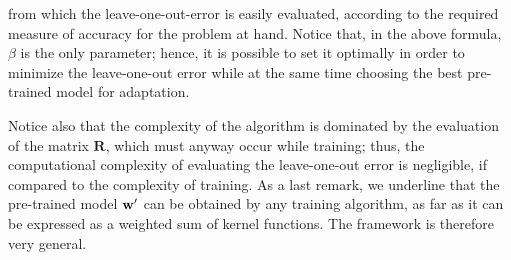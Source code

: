 \noindent from which the leave-one-out-error is easily evaluated, according
to the required measure of accuracy for the problem at hand. Notice that,
in the above formula, $\beta$ is the only parameter; hence,
it is possible to set it optimally in order to minimize the leave-one-out error
while at the same time choosing the best pre-trained model for adaptation.

Notice also that the complexity of the algorithm is dominated by the evaluation
of the matrix $\boldsymbol{R}$, which must anyway occur while training; thus,
the computational complexity of evaluating the leave-one-out error is negligible, if
compared to the complexity of training. As a last remark,
we underline that the pre-trained model $\mathbf{w}'$ can be
obtained by any training algorithm, as far as it can be expressed as a
weighted sum of kernel functions.  The framework is therefore very
general.
